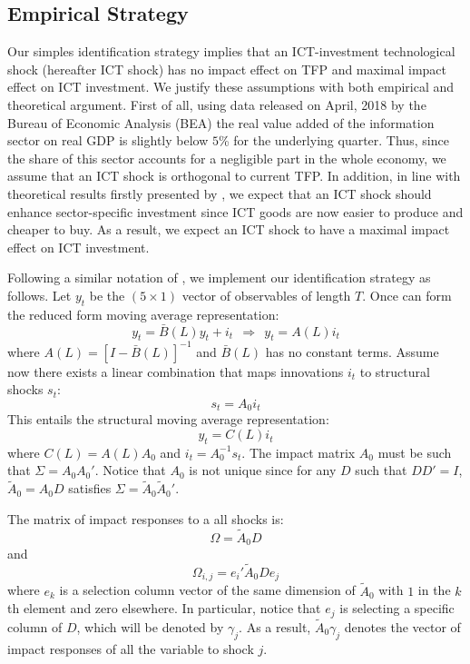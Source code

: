 \documentclass[12pt]{article}
\begin{document}
\subsection{Empirical Strategy}


Our simples identification strategy implies that an ICT-investment technological shock (hereafter ICT shock) has no impact effect on TFP and maximal impact effect on ICT investment. We justify these assumptions with both empirical and theoretical argument. First of all, using data released on April, 2018 by the Bureau of Economic Analysis (BEA) the real value added of the information sector on real GDP is slightly below $5$\% for the underlying quarter. Thus, since the share of this sector accounts for a negligible part in the whole economy, we assume that an ICT shock is orthogonal to current TFP. In addition, in line with theoretical results firstly presented by \cite{greenwood1997long}, we expect that an ICT shock should enhance sector-specific investment since ICT goods are now easier to produce and cheaper to buy. As a result, we expect an ICT shock to have a maximal impact effect on ICT investment. 

Following a similar notation of \cite{barsky2011news}, we implement our identification strategy as follows. Let $y_t$ be the $(5 \times 1)$ vector of observables of length $T$. Once can form the reduced form moving average representation:
$$
y_t = \bar{B}(L)y_{t} + i_t \ \ \Rightarrow \ \ y_t = A(L)i_t
$$
where $A(L) = [I - \bar{B}(L)]^{-1}$ and $\bar{B}(L)$ has no constant terms. Assume now there exists a linear combination that maps innovations $i_t$ to structural shocks $s_t$:
$$
s_t = A_0 i_t
$$
This entails the structural moving average representation:
$$
y_t = C(L)i_t
$$
where $C(L) = A(L) A_0$ and $i_t = A_0^{-1} s_t$. The impact matrix $A_0$ must be such that $\Sigma = A_0 A_0'$. Notice that $A_0$ is not unique since for any $D$ such that $DD' = I$, $\tilde{A}_0 = A_0 D$ satisfies $\Sigma = \tilde{A}_0 \tilde{A}_0'$. 

The matrix of impact responses to a all shocks is:
$$
\Omega = \tilde{A}_0 D
$$
and 
$$
\Omega_{i,j} = e_i' \tilde{A}_0 D e_j
$$
where $e_k$ is a selection column vector of the same dimension of $\tilde{A}_0$ with $1$ in the $k$th element and zero elsewhere. In particular, notice that $e_j$ is selecting a specific column of $D$, which will be denoted by $\gamma_j$. As a result, $\tilde{A}_0\gamma_j$ denotes the vector of impact responses of all the variable to shock $j$.
\end{document}
